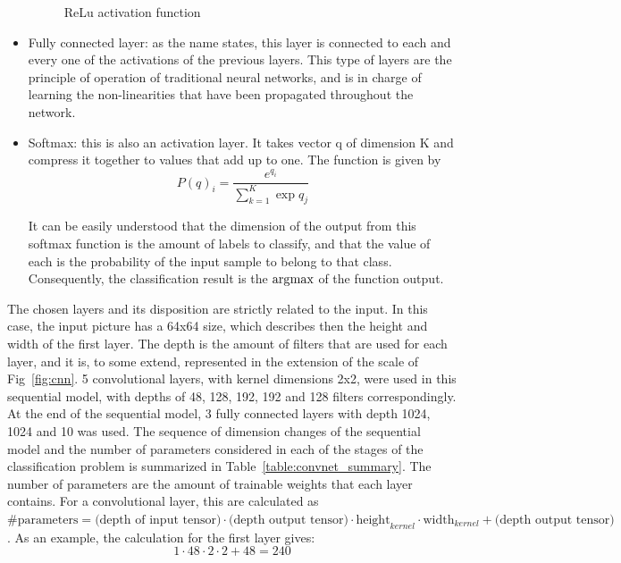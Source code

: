 \begin{itemize}
\begin{figure}[!htb]
              \caption{ReLu activation function}
              \label{fig:maxpool}
        \end{figure}
    \item Fully connected layer: as the name states, this layer is connected to each and every one of the activations of the previous layers. This type of layers are the principle of operation of traditional neural networks, and is in charge of learning the non-linearities that have been propagated throughout the network.
    \item Softmax: this is also an activation layer. It takes vector q of dimension K and compress it together to values that add up to one. The function is given by
        \begin{equation}
            P(q)_i = \frac{e^{q_i}}{\sum_{k=1}^{K} \exp{q_j}}
        \end{equation}

        It can be easily understood that the dimension of the output from this softmax function is the amount of labels to classify, and that the value of each is the probability of the input sample to belong to that class. Consequently, the classification result is the \( \operatorname*{\arg\!\max} \) of the function output.
\end{itemize}

The chosen layers and its disposition are strictly related to the input. In this case, the input picture has a 64x64 size, which describes then the height and width of the first layer. The depth is the amount of filters that are used for each layer, and it is, to some extend, represented in the extension of the scale of Fig~\ref{fig:cnn}. 5 convolutional layers, with kernel dimensions 2x2, were used in this sequential model, with depths of 48, 128, 192, 192 and 128 filters correspondingly. At the end of the sequential model, 3 fully connected layers with depth 1024, 1024 and 10 was used. The sequence of dimension changes of the sequential model and the number of parameters considered in each of the stages of the classification problem is summarized in Table~\ref{table:convnet_summary}. The number of parameters are the amount of trainable weights that each layer contains. For a convolutional layer, this are calculated as \( \text{\# parameters} = \text{(depth of input tensor)}\cdot\text{(depth output tensor)}\cdot\text{height}_{kernel}\cdot \text{width}_{kernel} + \text{(depth output tensor)} \). As an example, the calculation for the first layer gives:
\begin{equation*}
    1 \cdot 48 \cdot 2 \cdot 2 + 48 = 240
\end{equation*}


